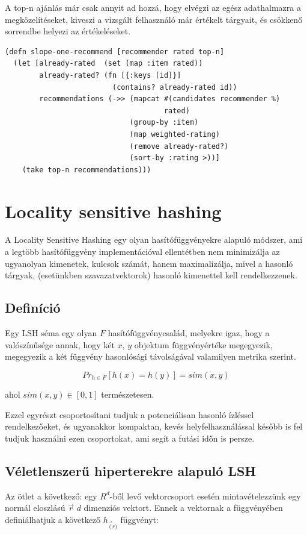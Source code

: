 \documentclass[final, 12pt] {ubb_dolgozat}{book}
\begin{document}
A top-n ajánlás már csak annyit ad hozzá, hogy elvégzi az egész adathalmazra a
megközelítéseket, kiveszi a vizsgált felhasználó már értékelt tárgyait, és csökkenő sorrendbe helyezi az értékeléseket.

\begin{verbatim}
(defn slope-one-recommend [recommender rated top-n]
  (let [already-rated  (set (map :item rated))
        already-rated? (fn [{:keys [id]}]
                         (contains? already-rated id))
        recommendations (->> (mapcat #(candidates recommender %)
                                     rated)
                             (group-by :item)
                             (map weighted-rating)
                             (remove already-rated?)
                             (sort-by :rating >))]
    (take top-n recommendations)))
\end{verbatim}

\section{Locality sensitive hashing}
\label{sec:org2a7ee75}
A Locality Sensitive Hashing egy olyan hasítófüggvényekre alapuló módszer, ami a legtöbb hasítófüggvény implementációval ellentétben nem minimizálja az ugyanolyan kimenetek, kulcsok
számát, hanem maximalizálja, mivel a hasonló tárgyak, (esetünkben szavazatvektorok) hasonló kimenettel kell rendelkezzenek.

\subsection{Definíció}
\label{sec:orgd435de7}
Egy LSH séma egy olyan \(F\) hasítófüggvénycsalád, melyekre igaz, hogy a valószínűsége annak,
hogy két \(x\), \(y\) objektum függvényértéke megegyezik, megegyezik a két függvény hasonlósági távolságával valamilyen metrika szerint. \citep{charikarSimilarityEstimationTechniques}

\begin{equation}
Pr_{h \in F} [h(x) = h(y)] = sim(x, y)
\end{equation}

ahol \(sim(x,y) \in [0,1]\) természetesen.

Ezzel egyrészt csoportosítani tudjuk a potenciálisan hasonló ízléssel rendelkezőeket, és ugyanakkor kompaktan, kevés helyfelhasználással később is fel tudjuk használni ezen csoportokat, ami segít a futási időn is persze.

\subsection{Véletlenszerű hiperterekre alapuló LSH}
\label{sec:orged3279e}
Az ötlet a következő: egy \(R^{d}\)-ből levő vektorcsoport esetén mintavételezzünk egy normál eloszlású \(\overrightarrow{r}\) \(d\) dimenziós vektort. Ennek a vektornak a függvényében definiálhatjuk a következő \(h_{\overrightarrow(r)}\) függvényt:
\end{document}
